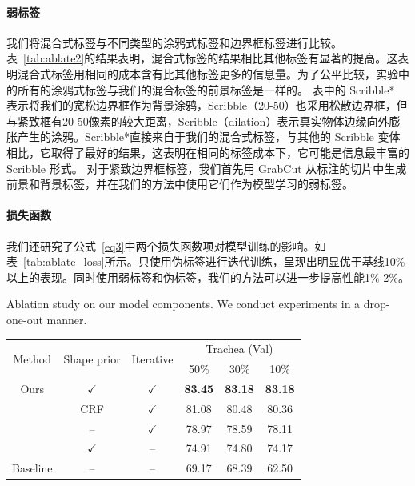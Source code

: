 \paragraph{弱标签}
我们将混合式标签与不同类型的涂鸦式标签和边界框标签进行比较。表~\ref{tab:ablate2}的结果表明，混合式标签的结果相比其他标签有显著的提高。这表明混合式标签用相同的成本含有比其他标签更多的信息量。为了公平比较，实验中的所有的涂鸦式标签与我们的混合标签的前景标签是一样的。
表中的 Scribble* 表示将我们的宽松边界框作为背景涂鸦，Scribble（20-50）也采用松散边界框，但与紧致框有20-50像素的较大距离，Scribble（dilation）表示真实物体边缘向外膨胀产生的涂鸦。Scribble*直接来自于我们的混合式标签，与其他的 Scribble 变体相比，它取得了最好的结果，这表明在相同的标签成本下，它可能是信息最丰富的 Scribble 形式。
对于紧致边界框标签，我们首先用 GrabCut 从标注的切片中生成前景和背景标签，并在我们的方法中使用它们作为模型学习的弱标签。
\paragraph{损失函数}
我们还研究了公式~\ref{eq3}中两个损失函数项对模型训练的影响。如表~\ref{tab:ablate_loss}所示。只使用伪标签进行迭代训练，呈现出明显优于基线10\%以上的表现。同时使用弱标签和伪标签，我们的方法可以进一步提高性能1\%-2\%。

\begin{table}[t!]
    \centering    
    {Ablation study on our model components. We conduct experiments in a drop-one-out manner.}
    \begin{tabular}[t]{c c c|c c c}
        \toprule
        \multirow{2}{*}{Method} & \multirow{2}{*}{Shape prior} & \multirow{2}{*}{Iterative}  & \multicolumn{3}{c}{Trachea (Val)} \\ %
        &                       &              & 50\% & 30\% & 10\%                 \\ \midrule
        Ours      & $\checkmark$  & $\checkmark$      & \textbf{83.45} & \textbf{83.18} & \textbf{83.18} \\ %
        & CRF      & $\checkmark$      & 81.08 & 80.48 & 80.36 \\
        & --            & $\checkmark$      & 78.97 & 78.59 & 78.11 \\ %
        & $\checkmark$  & --                & 74.91 & 74.80 & 74.17 \\
        Baseline      & --            & --                          & 69.17 & 68.39 & 62.50 \\
        \bottomrule 
    \end{tabular}
    \label{tab:ablate1}
\end{table}

